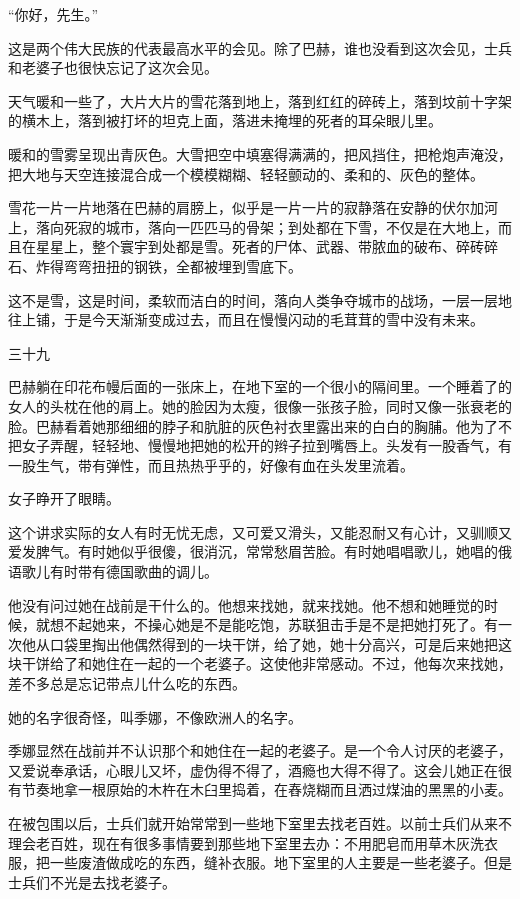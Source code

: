 “你好，先生。”

这是两个伟大民族的代表最高水平的会见。除了巴赫，谁也没看到这次会见，士兵和老婆子也很快忘记了这次会见。

天气暖和一些了，大片大片的雪花落到地上，落到红红的碎砖上，落到坟前十字架的横木上，落到被打坏的坦克上面，落进未掩埋的死者的耳朵眼儿里。

暖和的雪雾呈现出青灰色。大雪把空中填塞得满满的，把风挡住，把枪炮声淹没，把大地与天空连接混合成一个模模糊糊、轻轻颤动的、柔和的、灰色的整体。

雪花一片一片地落在巴赫的肩膀上，似乎是一片一片的寂静落在安静的伏尔加河上，落向死寂的城市，落向一匹匹马的骨架；到处都在下雪，不仅是在大地上，而且在星星上，整个寰宇到处都是雪。死者的尸体、武器、带脓血的破布、碎砖碎石、炸得弯弯扭扭的钢铁，全都被埋到雪底下。

这不是雪，这是时间，柔软而洁白的时间，落向人类争夺城市的战场，一层一层地往上铺，于是今天渐渐变成过去，而且在慢慢闪动的毛茸茸的雪中没有未来。

三十九

巴赫躺在印花布幔后面的一张床上，在地下室的一个很小的隔间里。一个睡着了的女人的头枕在他的肩上。她的脸因为太瘦，很像一张孩子脸，同时又像一张衰老的脸。巴赫看着她那细细的脖子和肮脏的灰色衬衣里露出来的白白的胸脯。他为了不把女子弄醒，轻轻地、慢慢地把她的松开的辫子拉到嘴唇上。头发有一股香气，有一股生气，带有弹性，而且热热乎乎的，好像有血在头发里流着。

女子睁开了眼睛。

这个讲求实际的女人有时无忧无虑，又可爱又滑头，又能忍耐又有心计，又驯顺又爱发脾气。有时她似乎很傻，很消沉，常常愁眉苦脸。有时她唱唱歌儿，她唱的俄语歌儿有时带有德国歌曲的调儿。

他没有问过她在战前是干什么的。他想来找她，就来找她。他不想和她睡觉的时候，就想不起她来，不操心她是不是能吃饱，苏联狙击手是不是把她打死了。有一次他从口袋里掏出他偶然得到的一块干饼，给了她，她十分高兴，可是后来她把这块干饼给了和她住在一起的一个老婆子。这使他非常感动。不过，他每次来找她，差不多总是忘记带点儿什么吃的东西。

她的名字很奇怪，叫季娜，不像欧洲人的名字。

季娜显然在战前并不认识那个和她住在一起的老婆子。是一个令人讨厌的老婆子，又爱说奉承话，心眼儿又坏，虚伪得不得了，酒瘾也大得不得了。这会儿她正在很有节奏地拿一根原始的木杵在木臼里捣着，在舂烧糊而且洒过煤油的黑黑的小麦。

在被包围以后，士兵们就开始常常到一些地下室里去找老百姓。以前士兵们从来不理会老百姓，现在有很多事情要到那些地下室里去办：不用肥皂而用草木灰洗衣服，把一些废渣做成吃的东西，缝补衣服。地下室里的人主要是一些老婆子。但是士兵们不光是去找老婆子。

